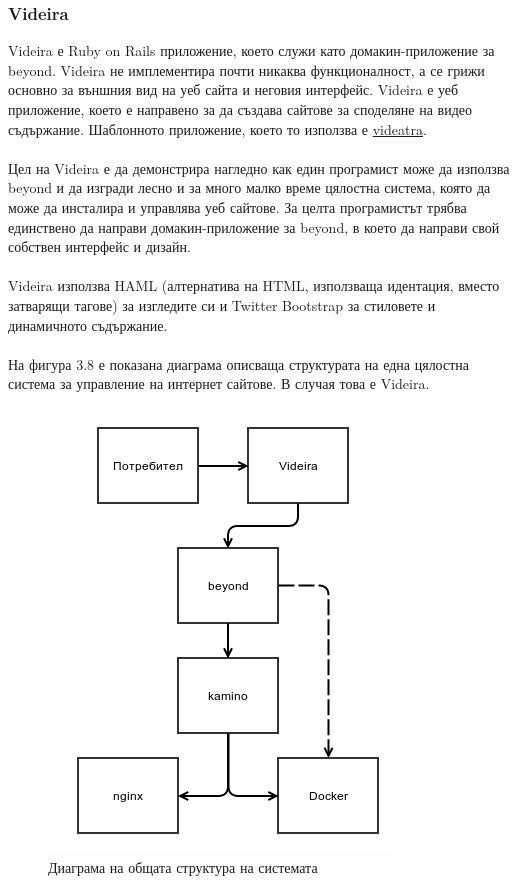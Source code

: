 \documentclass[pdftex,14pt,a4paper]{extreport}
\begin{document}
\subsubsection {Videira}
Videira е Ruby on Rails приложение, което служи като домакин-приложение за beyond. Videira не имплементира почти никаква функционалност, а се грижи основно за външния вид на уеб сайта и неговия интерфейс. Videira е уеб приложение, което е направено за да създава сайтове за споделяне на видео съдържание. Шаблонното приложение, което то използва е \href{https://github.com/d0ivanov/videatra}{videatra}.\\\\
Цел на Videira е да демонстрира нагледно как един програмист може да използва beyond и да изгради лесно и за много малко време цялостна система, която да може да инсталира и управлява уеб сайтове. За целта програмистът трябва единствено да направи домакин-приложение за beyond, в което да направи свой собствен интерфейс и дизайн.\\\\
Videira използва HAML (алтернатива на HTML, използваща идентация, вместо затварящи тагове) за изгледите си и Twitter Bootstrap за стиловете и динамичното съдържание.\\\\
На фигура 3.8 е показана диаграма описваща структурата на една цялостна система за управление на интернет сайтове. В случая това е Videira.
\begin{figure}[H]
  \centering
  \includegraphics [scale=0.7]{./diagram_all}
  \caption {Диаграма на общата структура на системата}
\end{figure}
\end{document}
